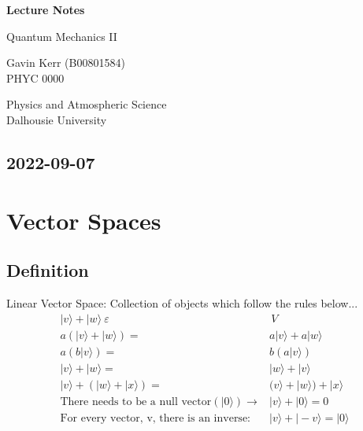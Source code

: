 \documentclass[12pt]{article}
\begin{document}
\begin{titlepage}
   \begin{center}
       \vspace*{0.5cm}

       \LARGE{\textbf{Lecture Notes}}

       \vspace{1cm}
        \Large{Quantum Mechanics II}
            
       \vspace{1cm}
		\small{Gavin Kerr (B00801584)} \\
		\vfill
       \vfill
           \large{ PHYC 0000}
            
       \vspace{0.8cm}
     
            
       Physics and Atmospheric Science\\
       Dalhousie University\\
            
   \end{center}
\end{titlepage}





\subsection*{2022-09-07}

\section{Vector Spaces}

\subsection*{Definition} 

Linear Vector Space: Collection of objects which follow the rules below...
\begin{align*}
|v\rangle + |w\rangle \ \varepsilon& \, V
\\
a(|v\rangle + |w\rangle) =& a|v\rangle + a|w\rangle
\\
a(b|v\rangle) =& b(a|v\rangle)
\\
|v\rangle + |w\rangle =& |w\rangle + |v\rangle
\\
|v\rangle + (|w\rangle + |x\rangle) =& 
(v\rangle + |w\rangle) + |x\rangle
\\
\text{There needs to be a null vector} (|0\rangle) \rightarrow& |v\rangle + |0\rangle = 0 
\\
\text{For every vector, v, there is an inverse: } &
|v\rangle + |-v\rangle = |0\rangle
\end{align*}
\end{document}
